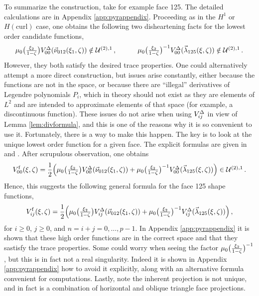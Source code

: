 To summarize the construction, take for example face 125.
The detailed calculations are in Appendix \ref{app:pyrappendix}.
Proceeding as in the $H^1$ or $H(\mathrm{curl})$ case, one obtains the following two disheartening facts for the lowest order candidate functions,
\begin{equation*}
	\mu_0\big(\textstyle{\frac{\xi_2}{1-\zeta}}\big)V_{00}^\Delta(\vec{\nu}_{012}(\xi_1,\zeta))\notin\mathcal{U}^{(2),1}\,,\qquad\quad
	\mu_0\big(\textstyle{\frac{\xi_2}{1-\zeta}}\big)^{-1}V_{00}^\Delta(\vec{\lambda}_{125}(\xi,\zeta))\notin\mathcal{U}^{(2),1}\,.
\end{equation*}
However, they both satisfy the desired trace properties.
One could alternatively attempt a more direct construction, but issues arise constantly, either because the functions are not in the space, or because there are ``illegal'' derivatives of Legendre polynomials $P_i$, which in theory should not exist as they are elements of $L^2$ and are intended to approximate elements of that space (for example, a discontinuous function).
These issues do not arise when using $V_{ij}^\Delta$ in view of Lemma \ref{lem:divformula}, and this is one of the reasons why it is so convenient to use it.
Fortunately, there is a way to make this happen.
The key is to look at the unique lowest order function for a given face. 
The explicit formulas are given in \citet{Hiptmair99} and \citet{Nigam_Phillips_11}.
After scrupulous observation, one obtains
\begin{equation*}
	V_{00}^\mathrm{f}(\xi,\zeta)=\frac{1}{2}\Big(\mu_0\big(\textstyle{\frac{\xi_2}{1-\zeta}}\big)V_{00}^\Delta(\vec{\nu}_{012}(\xi_1,\zeta))+
		\mu_0\big(\textstyle{\frac{\xi_2}{1-\zeta}}\big)^{-1}V_{00}^\Delta(\vec{\lambda}_{125}(\xi,\zeta))\Big)\in\mathcal{U}^{(2),1}\,.
\end{equation*}
Hence, this suggests the following general formula for the face 125 shape functions,
\begin{equation*}
	V_{ij}^\mathrm{f}(\xi,\zeta)=\frac{1}{2}\Big(\mu_0\big(\textstyle{\frac{\xi_2}{1-\zeta}}\big)V_{ij}^\Delta(\vec{\nu}_{012}(\xi_1,\zeta))+
		\mu_0\big(\textstyle{\frac{\xi_2}{1-\zeta}}\big)^{-1}V_{ij}^\Delta(\vec{\lambda}_{125}(\xi,\zeta))\Big)\,,
\end{equation*}
for $i\geq0$, $j\geq0$, and $n=i+j=0,\ldots,p-1$. 
In Appendix \ref{app:pyrappendix} it is shown that these high order functions are in the correct space and that they sastisfy the trace properties.
Some could worry when seeing the factor $\mu_0\big(\textstyle{\frac{\xi_2}{1-\zeta}}\big)^{-1}$, but this is in fact not a real singularity.
Indeed it is shown in Appendix \ref{app:pyrappendix} how to avoid it explicitly, along with an alternative formula convenient for computations.
Lastly, note the inherent projection is not unique, and in fact is a combination of horizontal and oblique triangle face projections.

